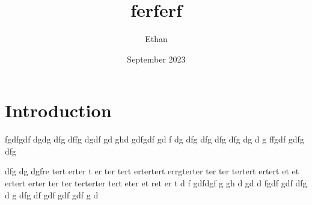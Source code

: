 \documentclass{article}
\title{ferferf}
\author{Ethan }
\date{September 2023}
\begin{document}
\maketitle

\section{Introduction}
fgdfgdf
dgdg
dfg
dffg dgdf gd ghd gdfgdf gd f
dg dfg dfg dfg dfg dg 
d g ffgdf gdfg  dfg

 dfg 
 dg dgfre tert erter t
 er ter tert ertertert errgterter ter ter tertert ertert et et
 ertert erter ter ter terterter tert eter et ret er t
 d f
 gdfdgf g 
 gh
 d gd d fgdf  gdf 
dfg
d
g
dfg
df
gdf
gdf
gdf
g
d
\end{document}

